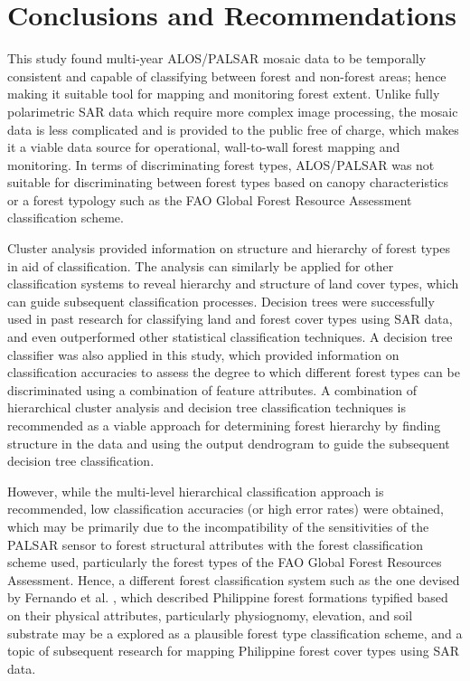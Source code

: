 
\chapter{Conclusions and Recommendations}
\label{cha: conclusions}

This study found multi-year ALOS/PALSAR mosaic data to be temporally consistent and capable of classifying between forest and non-forest areas; hence making it suitable tool for mapping and monitoring forest extent. Unlike fully polarimetric SAR data which require more complex image processing, the mosaic data is less complicated and is provided to the public free of charge, which makes it a viable data source for operational, wall-to-wall forest mapping and monitoring. In terms of discriminating forest types, ALOS/PALSAR was not suitable for discriminating between forest types based on canopy characteristics or a forest typology such as the FAO Global Forest Resource Assessment classification scheme.

Cluster analysis provided information on structure and hierarchy of forest types in aid of classification. The analysis can similarly be applied for other classification systems to reveal hierarchy and structure of land cover types, which can guide subsequent classification processes. Decision trees were successfully used in past research for classifying land and forest cover types using SAR data, and even outperformed other statistical classification techniques. A decision tree classifier was also applied in this study, which provided information on classification accuracies to assess the degree to which different forest types can be discriminated using a combination of feature attributes. A combination of hierarchical cluster analysis and decision tree classification techniques is recommended as a viable approach for determining forest hierarchy by finding structure in the data and using the output dendrogram to guide the subsequent decision tree classification.

However, while the multi-level hierarchical classification approach is recommended, low classification accuracies (or high error rates) were obtained, which may be primarily due to the incompatibility of the sensitivities of the PALSAR sensor to forest structural attributes with the forest classification scheme used, particularly the forest types of the FAO Global Forest Resources Assessment. Hence, a different forest classification system such as the one devised by Fernando et al. \citeyearpar{fernando_forest_2008}, which described Philippine forest formations typified based on their physical attributes, particularly physiognomy, elevation, and soil substrate may be a explored as a plausible forest type classification scheme, and a topic of subsequent research for mapping Philippine forest cover types using SAR data.

